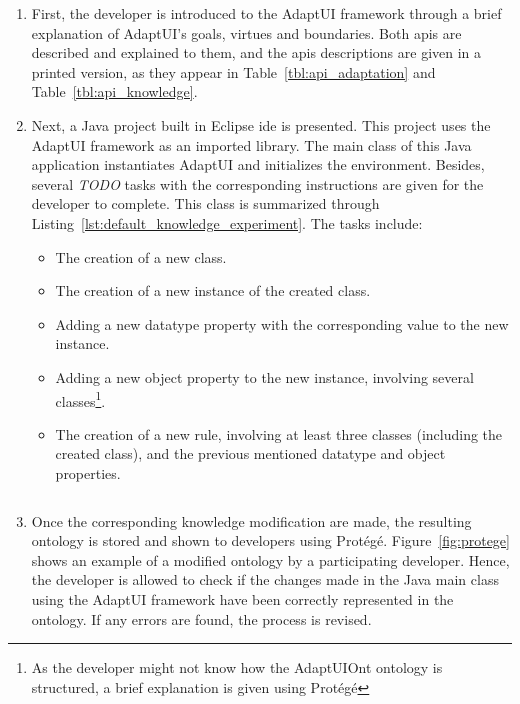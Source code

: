 \begin{enumerate}
  \item First, the developer is introduced to the AdaptUI framework through a brief
  explanation of AdaptUI's goals, virtues and boundaries. Both \acp{api} are 
  described and explained to them, and the \acp{api} descriptions are given in a 
  printed version, as they appear in Table~\ref{tbl:api_adaptation} and
  Table~\ref{tbl:api_knowledge}.
  
  \item Next, a Java project built in Eclipse \ac{ide} is presented. This project
  uses the AdaptUI framework as an imported library. The main class of this Java
  application instantiates AdaptUI and initializes the environment. Besides,
  several \textit{TODO} tasks with the corresponding instructions are given for
  the developer to complete. This class is summarized through
  Listing~\ref{lst:default_knowledge_experiment}. The tasks include:
  \begin{itemize}
    \item The creation of a new class.
    \item The creation of a new instance of the created class.
    \item Adding a new datatype property with the corresponding value to the
    new instance.
    \item Adding a new object property to the new instance, involving several
    classes\footnote{As the developer might not know how the AdaptUIOnt ontology
    is structured, a brief explanation is given using Protégé}.
    \item The creation of a new rule, involving at least three classes (including
    the created class), and the previous mentioned datatype and object properties.
  \end{itemize}

  \inputminted[linenos=true, fontsize=\footnotesize, frame=lines]{java}{5_experiments_and_results/default_knowledge_experiment.java}

  \item Once the corresponding knowledge modification are made, the resulting
  ontology is stored and shown to developers using Protégé. Figure~\ref{fig:protege}
  shows an example of a modified ontology by a participating developer. Hence,
  the developer is allowed to check if the changes made in the Java main class
  using the AdaptUI framework have been correctly represented in the ontology.
  If any errors are found, the process is revised.


\end{enumerate}
